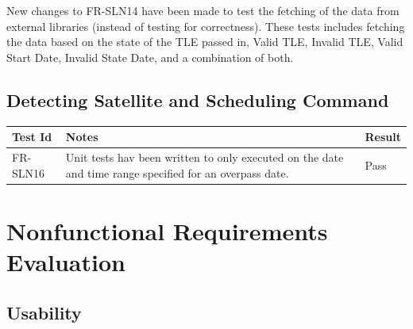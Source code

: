 \documentclass[12pt, titlepage]{article}
\begin{document}
New changes to FR-SLN14 have been made to test the fetching of the
data from external libraries (instead of testing for correctness). These
tests includes fetching the data based on the state of the TLE passed
in, Valid TLE, Invalid TLE, Valid Start Date, Invalid State Date, and
a combination of both.

\subsection{Detecting Satellite and Scheduling Command}

\begin{center}
\begin{tabular}{|p{2cm} | p{8cm} |p{2cm}| }
\hline
\textbf{Test Id} & \textbf{Notes} & \textbf{Result} \\
\hline
FR-SLN16 & Unit tests hav been written to only executed on the date and time range specified for an overpass date. & Pass \\
\hline

\end{tabular}
\end{center}

\section{Nonfunctional Requirements Evaluation}

\subsection{Usability}
\end{document}
